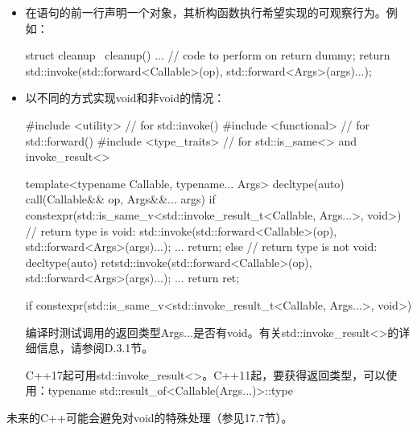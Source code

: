 \begin{itemize}
\item
在语句的前一行声明一个对象，其析构函数执行希望实现的可观察行为。例如：

\begin{cpp}
struct cleanup {
	~cleanup() {
		... // code to perform on return
	}
} dummy;
return std::invoke(std::forward<Callable>(op),
					std::forward<Args>(args)...);
\end{cpp}

\item
以不同的方式实现void和非void的情况：

\begin{cpp}
#include <utility> // for std::invoke()
#include <functional> // for std::forward()
#include <type_traits> // for std::is_same<> and invoke_result<>

template<typename Callable, typename... Args>
decltype(auto) call(Callable&& op, Args&&... args) {
	if constexpr(std::is_same_v<std::invoke_result_t<Callable, Args...>,
	void>) {
		// return type is void:
		std::invoke(std::forward<Callable>(op),
					std::forward<Args>(args)...);
		...
		return;
	}
	else {
		// return type is not void:
		decltype(auto) ret{std::invoke(std::forward<Callable>(op),
							std::forward<Args>(args)...)};
		...
		return ret;
	}
}
\end{cpp}

\begin{cpp}
if constexpr(std::is_same_v<std::invoke_result_t<Callable, Args...>, void>)
\end{cpp}

编译时测试调用的返回类型Args...是否有void。有关std::invoke\_result<>的详细信息，请参阅D.3.1节。

\begin{notice}
C++17起可用std::invoke\_result<>。C++11起，要获得返回类型，可以使用：typename std::result\_of<Callable(Args...)>::type
\end{notice}

\end{itemize}

未来的C++可能会避免对void的特殊处理（参见17.7节）。












